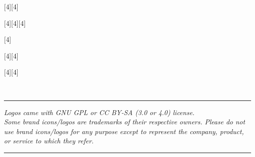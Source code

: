 \documentclass[11pt,a4paper]{ltxdoc}
\begin{document}
\begin{tcolorbox}[colframe=lightgray,colback=lightgray!5]
\begin{center}
%
%

\medskip

\scalebox{4}[4]{\logogeogebra}\hspace{1cm}\scalebox{4}[4]{\logogeogebra[icon]}

\medskip

\scalebox{4}[4]{\logoscratch}\hspace{1cm}\scalebox{4}[4]{\logoscratch[alt]}\hspace{1cm}\scalebox{4}[4]{\logoscratch[cat]}

\medskip

\scalebox{4}[4]{\logotexstudio}

\medskip

\scalebox{4}[4]{\logoemacs}\scalebox{4}[4]{\logoemacs[alt]}

\medskip

\scalebox{4}[4]{\logotexmaker}\scalebox{4}[4]{\logotexmaker[alt]}
\end{center}
\end{tcolorbox}

\vfill~

\hrule

\medskip

\emph{%
Logos came with GNU GPL or CC BY-SA (3.0 or 4.0) license.\\
Some brand icons/logos are trademarks of their respective owners. Please do not use brand icons/logos for any purpose except to represent the company, product, or service to which they refer.%
}

\medskip

\hrule

\vspace*{5mm}

\pagebreak

\end{document}
